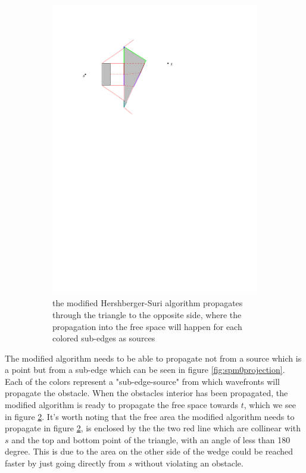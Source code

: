 \begin{figure}[H]
\begin{subfigure}{.5\textwidth}
  \includegraphics[width=.95\linewidth]{figures/spm1.pdf}
  \caption{the modified Hershberger-Suri algorithm propagates through the triangle to the 
  		   opposite side, where the propagation into the free space will happen for each 
           colored sub-edges as sources}
  \label{fig:spm1}
\end{subfigure}
\caption{}
\end{figure}

The modified algorithm needs to be able to propagate not from a source which is a point but 
from a sub-edge which can be seen in figure \ref{fig:spm0projection}. Each of the colors 
represent a "sub-edge-source" from which wavefronts will propagate the obstacle. When the 
obstacles interior has been propagated, the modified algorithm is ready to propagate the free 
space towards $t$, which we see in figure \ref{fig:spm1}. It's worth noting that the free area 
the modified algorithm needs to propagate in figure \ref{fig:spm1}, is enclosed by the the two 
red line which are collinear with $s$ and the top and bottom point of the triangle, with an 
angle of less than 180 degree. This is due to the area on the other side of the wedge could be 
reached faster by just going directly from $s$ without violating an obstacle.

